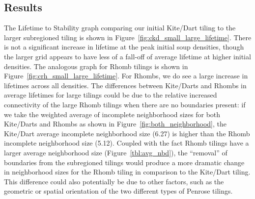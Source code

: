 \documentclass[a4paper,11pt,twoside]{report}
\begin{document}
\subsection*{Results}
The Lifetime to Stability graph comparing our initial Kite/Dart tiling to the larger subregioned tiling is shown in Figure~\ref{fig:ckd_small_large_lifetime}. There is not a significant increase in lifetime at the peak initial soup densities, though the larger grid appears to have less of a fall-off of average lifetime at higher initial densities. The analogous graph for Rhomb tilings is shown in Figure~\ref{fig:crh_small_large_lifetime}. For Rhombs, we do see a large increase in lifetimes across all densities. The differences between Kite/Darts and Rhombs in average lifetimes for large tilings could be due to the relative increased connectivity of the large Rhomb tilings when there are no boundaries present: if we take the weighted average of incomplete neighborhood sizes for both Kite/Darts and Rhombs as shown in Figure~\ref{fig:both_neighborhood}, the Kite/Dart average incomplete neighborhood size (6.27) is higher than the Rhomb incomplete neighborhood size (5.12). Coupled with the fact Rhomb tilings have a larger average neighborhood size (Figure~\ref{tbl:avg_nbd}), the ``removal'' of boundaries from the subregioned tilings would produce a more dramatic change in neighborhood sizes for the Rhomb tiling in comparison to the Kite/Dart tiling. This difference could also potentially be due to other factors, such as the geometric or spatial orientation of the two different types of Penrose tilings.

\end{document}
